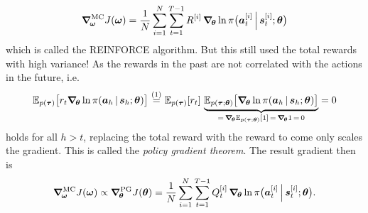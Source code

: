 					\begin{equation*}
						\grad_{\!\bm{\omega}}^\mathrm{MC} J(\bm{\omega})
							= \frac{1}{N} \sum_{i = 1}^{N} \sum_{t = 1}^{T - 1} R^{[i]} \, \grad_{\!\bm{\theta}} \ln \pi\big(\bm{a}_t^{[i]} \,\Big\vert\, \bm{s}_t^{[i]}; \bm{\theta}\big)
					\end{equation*}
					which is called the REINFORCE algorithm. But this still used the total rewards with high variance! As the rewards in the past are not correlated with the actions in the future, i.e.
					\begin{equation*}
						\E_{p(\vec{\tau})}\big[ r_t \grad_{\!\vec{\theta}} \ln \pi(\vec{a}_h \given \vec{s}_h; \vec{\theta}) \big]
							\,\oversetfootnotemark{=}\, \E_{p(\vec{\tau})}[r_t] \, \underbrace{\E_{p(\vec{\tau}; \vec{\theta})}\big[ \grad_{\!\vec{\theta}} \ln \pi(\vec{a}_h \given \vec{s}_h; \vec{\theta}) \big]}_{\mathclap{=\, \grad_{\!\vec{\theta}} \E_{p(\vec{\tau}; \vec{\theta})}[1] \,=\, \grad_{\!\vec{\theta}} 1 \,=\, 0}}
							= 0
					\end{equation*}
					holds for all \( h > t \), replacing the total reward with the reward to come only scales the gradient. This is called the \emph{policy gradient theorem}. The result gradient then is
					\begin{equation*}
						\grad_{\!\bm{\omega}}^\mathrm{MC} J(\bm{\omega})
							\propto \grad_{\!\bm{\theta}}^\mathrm{PG} J(\bm{\theta})
							= \frac{1}{N} \sum_{i = 1}^{N} \sum_{t = 1}^{T - 1} Q_t^{[i]} \, \grad_{\!\bm{\theta}} \ln \pi\big(\bm{a}_t^{[i]} \,\Big\vert\, \bm{s}_t^{[i]}; \bm{\theta}\big).
					\end{equation*}


